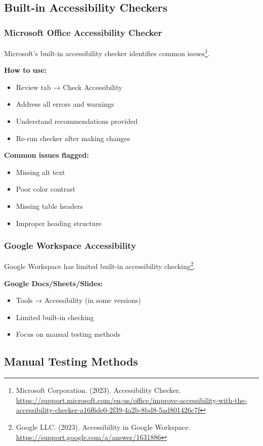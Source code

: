 \subsection{Built-in Accessibility Checkers}

\subsubsection{Microsoft Office Accessibility Checker}
Microsoft's built-in accessibility checker identifies common issues\footnote{Microsoft Corporation. (2023). Accessibility Checker. \url{https://support.microsoft.com/en-us/office/improve-accessibility-with-the-accessibility-checker-a16f6de0-2f39-4a2b-8bd8-5ad801426c7f}}.

\textbf{How to use:}
\begin{itemize}
\item Review tab → Check Accessibility
\item Address all errors and warnings
\item Understand recommendations provided
\item Re-run checker after making changes
\end{itemize}

\textbf{Common issues flagged:}
\begin{itemize}
\item Missing alt text
\item Poor color contrast
\item Missing table headers
\item Improper heading structure
\end{itemize}

\subsubsection{Google Workspace Accessibility}
Google Workspace has limited built-in accessibility checking\footnote{Google LLC. (2023). Accessibility in Google Workspace. \url{https://support.google.com/a/answer/1631886}}.

\textbf{Google Docs/Sheets/Slides:}
\begin{itemize}
\item Tools → Accessibility (in some versions)
\item Limited built-in checking
\item Focus on manual testing methods
\end{itemize}

\subsection{Manual Testing Methods}

